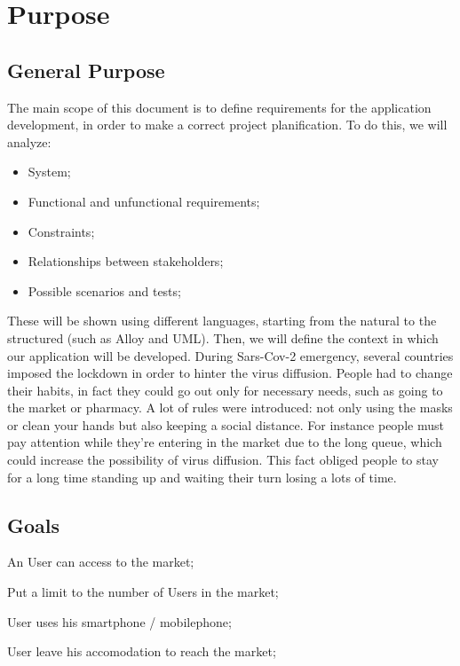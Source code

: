 \section{Purpose}
\subsection{General Purpose}

The main scope of this document is to define requirements for the application development, in order to make a correct project planification. 
To do this, we will analyze:

\begin{itemize}
\item System;
\item Functional and unfunctional requirements;
\item Constraints;
\item Relationships between stakeholders;
\item Possible scenarios and tests;
\end{itemize}
\medskip
These will be shown using different languages, starting from the natural to the structured (such as Alloy and UML).
Then, we will define the context in which our application will be developed.
During Sars-Cov-2 emergency, several countries imposed the lockdown in order to hinter the virus diffusion.
People had to change their habits, in fact they could go out only for necessary needs, such as going to the market or pharmacy.
A lot of rules were introduced: not only using the masks or clean your hands but also keeping a social distance.
For instance people must pay attention while they're entering in the market due to the long queue, which could increase the possibility of virus diffusion.
This fact obliged people to stay for a long time standing up and waiting their turn losing a lots of time. 




\subsection{Goals}


\begin{description}
    \item An User can access to the market;
    \item Put a limit to the number of Users in the market;
    \item User uses his smartphone / mobilephone;
    \item User leave his accomodation to reach the market;
\end{description}

